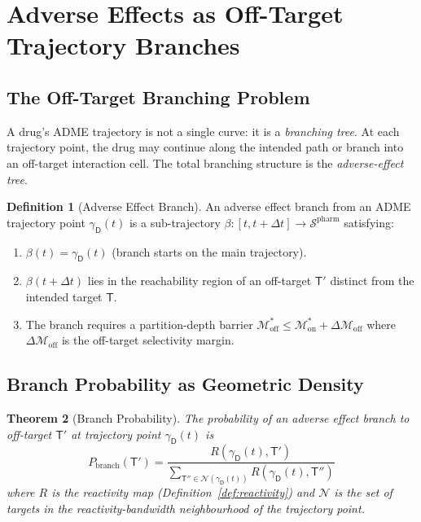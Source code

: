 \documentclass[11pt,twocolumn,a4paper]{article}
\newtheorem{theorem}{Theorem}[section]
\theoremstyle{definition}
\newtheorem{definition}[theorem]{Definition}
\theoremstyle{remark}
\newcommand{\Sspace}{\mathcal{S}}
\newcommand{\Depth}{\mathcal{M}}
\newcommand{\Drug}{\mathsf{D}}
\newcommand{\Target}{\mathsf{T}}
\begin{document}
\section{Adverse Effects as Off-Target Trajectory Branches}
\label{sec:adverse}

\subsection{The Off-Target Branching Problem}

A drug's ADME trajectory is not a single curve: it is a \emph{branching tree}. At each trajectory point, the drug may continue along the intended path or branch into an off-target interaction cell. The total branching structure is the \emph{adverse-effect tree}.

\begin{definition}[Adverse Effect Branch]
\label{def:adverse_branch}
An adverse effect branch from an ADME trajectory point $\gamma_\Drug(t)$ is a sub-trajectory $\beta: [t, t+\Delta t] \to \Sspace^{\mathrm{pharm}}$ satisfying:
\begin{enumerate}[nosep,label=(\roman*)]
\item $\beta(t) = \gamma_\Drug(t)$ (branch starts on the main trajectory).
\item $\beta(t + \Delta t)$ lies in the reachability region of an off-target $\Target'$ distinct from the intended target $\Target$.
\item The branch requires a partition-depth barrier $\Depth^*_{\mathrm{off}} \leq \Depth^*_{\mathrm{on}} + \Delta\Depth_{\mathrm{off}}$ where $\Delta\Depth_{\mathrm{off}}$ is the off-target selectivity margin.
\end{enumerate}
\end{definition}

\subsection{Branch Probability as Geometric Density}

\begin{theorem}[Branch Probability]
\label{thm:branch_prob}
The probability of an adverse effect branch to off-target $\Target'$ at trajectory point $\gamma_\Drug(t)$ is
\begin{equation}
P_{\mathrm{branch}}(\Target') = \frac{R(\gamma_\Drug(t), \Target')}{\sum_{\Target'' \in \mathcal{N}(\gamma_\Drug(t))} R(\gamma_\Drug(t), \Target'')}
\end{equation}
where $R$ is the reactivity map (Definition~\ref{def:reactivity}) and $\mathcal{N}$ is the set of targets in the reactivity-bandwidth neighbourhood of the trajectory point.
\end{theorem}
\end{document}
